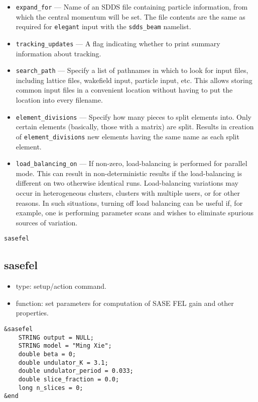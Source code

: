 \documentclass[11pt]{article}
\begin{document}
\begin{itemize}
\item \verb|expand_for| --- Name of an SDDS file containing particle information, from which the central
momentum will be set.  The file contents are the same as required for {\tt elegant} input with the \verb|sdds_beam| namelist.
\item \verb|tracking_updates| --- A flag indicating whether to print summary information about
tracking.
\item \verb|search_path| --- Specify a list of pathnames in which to look for input files,
 including lattice files, wakefield input, particle input, etc.  This allows storing common
 input files in a convenient location without having to put the location into every filename.
\item \verb|element_divisions| --- Specify how many pieces to split elements into.  Only 
 certain elements (basically, those with a matrix) are split.  Results in creation of 
 \verb|element_divisions| new elements having the same name as each split element.
\item \verb|load_balancing_on| --- If non-zero, load-balancing is performed for parallel mode.
 This can result in non-deterministic results if the load-balancing is different on two
 otherwise identical runs.  Load-balancing variations may occur in heterogeneous clusters,
 clusters with multiple users, or for other reasons.  In such situations, turning off 
 load balancing can be useful if, for example, one is performing parameter scans and
 wishes to eliminate spurious sources of variation.
\end{itemize}

\begin{latexonly}
\newpage
\begin{center}{\Large\verb|sasefel|}\end{center}
\end{latexonly}
\subsection{sasefel \label{subsec:sasefel}}

\begin{itemize}
\item type: setup/action command.
\item function: set parameters for computation of SASE FEL gain and other properties.
\end{itemize}

\begin{verbatim}
&sasefel
    STRING output = NULL;
    STRING model = "Ming Xie";
    double beta = 0;
    double undulator_K = 3.1;
    double undulator_period = 0.033;
    double slice_fraction = 0.0;
    long n_slices = 0;
&end
\end{verbatim}
\end{document}
